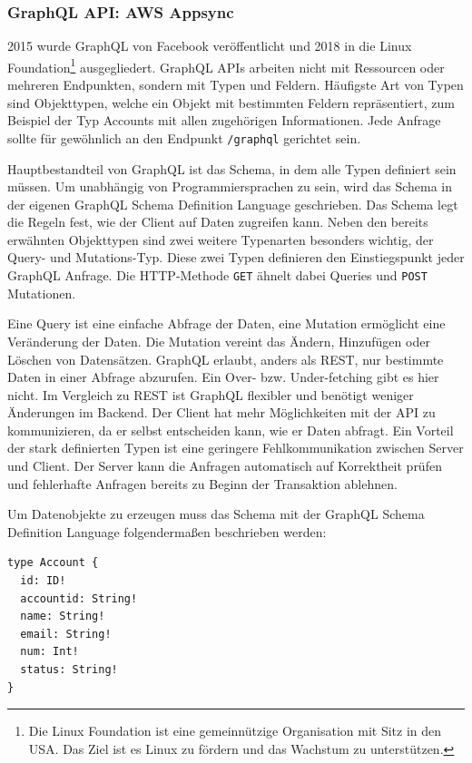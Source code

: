 \subsubsection{GraphQL API: AWS Appsync}
\label{GraphQL}
2015 wurde GraphQL von Facebook veröffentlicht und 2018 in die Linux Foundation\footnote{Die Linux Foundation ist eine gemeinnützige Organisation mit Sitz in den USA.
Das Ziel ist es Linux zu fördern und das Wachstum zu unterstützen.} ausgegliedert.
GraphQL APIs arbeiten nicht mit Ressourcen oder mehreren Endpunkten, sondern mit Typen und Feldern.
Häufigste Art von Typen sind Objekttypen, welche ein Objekt mit bestimmten Feldern repräsentiert, zum Beispiel der Typ Accounts mit allen zugehörigen Informationen.
Jede Anfrage sollte für gewöhnlich an den Endpunkt \verb+/graphql+ gerichtet sein.

Hauptbestandteil von GraphQL ist das Schema, in dem alle Typen definiert sein müssen.
Um unabhängig von Programmiersprachen zu sein, wird das Schema in der eigenen GraphQL Schema Definition Language geschrieben.
Das Schema legt die Regeln fest, wie der Client auf Daten zugreifen kann.
Neben den bereits erwähnten Objekttypen sind zwei weitere Typenarten besonders wichtig, der Query- und Mutations-Typ.
Diese zwei Typen definieren den Einstiegspunkt jeder GraphQL Anfrage.
Die HTTP-Methode \verb+GET+ ähnelt dabei Queries und \verb+POST+ Mutationen. \cite{GraphQL1}

Eine Query ist eine einfache Abfrage der Daten, eine Mutation ermöglicht eine Veränderung der Daten.
Die Mutation vereint das Ändern, Hinzufügen oder Löschen von Datensätzen.
GraphQL erlaubt, anders als REST, nur bestimmte Daten in einer Abfrage abzurufen. Ein Over- bzw. Under-fetching gibt es hier nicht.
Im Vergleich zu REST ist GraphQL flexibler und benötigt weniger Änderungen im Backend.
Der Client hat mehr Möglichkeiten mit der API zu kommunizieren, da er selbst entscheiden kann, wie er Daten abfragt.
Ein Vorteil der stark definierten Typen ist eine geringere Fehlkommunikation zwischen Server und Client.
Der Server kann die Anfragen automatisch auf Korrektheit prüfen und fehlerhafte Anfragen bereits zu Beginn der Transaktion ablehnen.

Um Datenobjekte zu erzeugen muss das Schema mit der GraphQL Schema Definition Language folgendermaßen beschrieben werden:
\begin{lstlisting}[basicstyle=\ttfamily, breaklines=true , frame = single, backgroundcolor=\color{flashwhite} ]
type Account {
  id: ID!
  accountid: String!
  name: String!
  email: String!
  num: Int!
  status: String!
}
\end{lstlisting}

